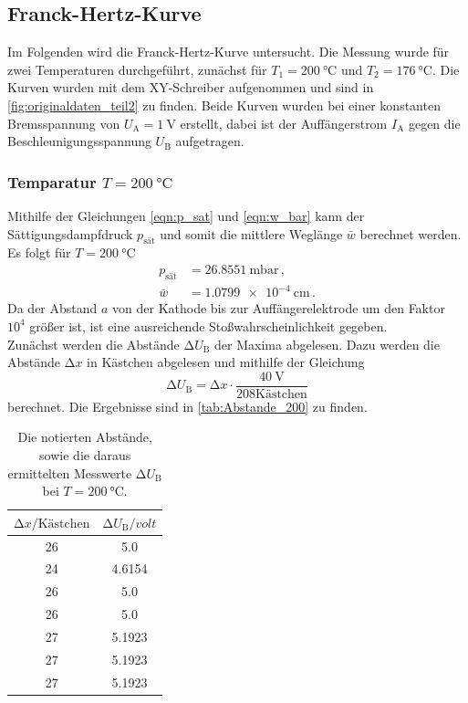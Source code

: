 \subsection{Franck-Hertz-Kurve}
Im Folgenden wird die Franck-Hertz-Kurve untersucht.
Die Messung wurde für zwei Temperaturen durchgeführt, zunächst für $T_1 = \SI{200}{\celsius}$ und $T_2 = \SI{176}{\celsius}$.
Die Kurven wurden mit dem XY-Schreiber aufgenommen und sind in \autoref{fig:originaldaten_teil2} zu finden.
Beide Kurven wurden bei einer konstanten Bremsspannung von $U_\text{A}  = \SI{1}{\volt}$ erstellt, dabei ist der Auffängerstrom $I_\text{A}$ gegen die Beschleunigungsspannung $U_\text{B}$ aufgetragen.

\subsubsection{Temparatur $T = \SI{200}{\celsius}$}
Mithilfe der Gleichungen \eqref{eqn:p_sat} und \eqref{eqn:w_bar} kann der Sättigungsdampfdruck $p_\text{sät}$ und somit die mittlere Weglänge $\bar{w}$ berechnet werden.
Es folgt für $T = \SI{200}{\celsius}$
\begin{align*}
    p_\text{sät} &= \SI{26.8551}{\milli\bar} \, , \\
    \bar{w} &= \SI{1.0799e-4}{\centi\metre} \, .
\end{align*}
Da der Abstand $a$ von der Kathode bis zur Auffängerelektrode um den Faktor $10^4$ größer ist, ist eine ausreichende Stoßwahrscheinlichkeit gegeben.\\

\noindent
Zunächst werden die Abstände $\increment U_\text{B}$ der Maxima abgelesen.
Dazu werden die Abstände $\increment x$ in Kästchen abgelesen und mithilfe der Gleichung
\begin{equation}
    \label{eqn:delta_U_B}
    \increment U_\text{B} = \increment x \cdot \frac{\SI{40}{\volt}}{208 \text{Kästchen}}
\end{equation}
berechnet.
Die Ergebnisse sind in \autoref{tab:Abstande_200} zu finden.

\begin{table}
    \centering
    \caption{Die notierten Abstände, sowie die daraus ermittelten Messwerte $\increment U_\text{B}$ bei $T=\SI{200}{\celsius}$.} 
    \label{tab:Abstande_200}
    \begin{tabular}{c c}
    \toprule
    $\increment x /\text{Kästchen}$ & $\increment U_\text{B} / \si{volt}$\\
    \midrule
      26 &  5.0\\
      24 &  4.6154\\
      26 &  5.0\\
      26 &  5.0\\
      27 &  5.1923\\
      27 &  5.1923\\
      27 &  5.1923\\
    \bottomrule
    \end{tabular}
\end{table}

